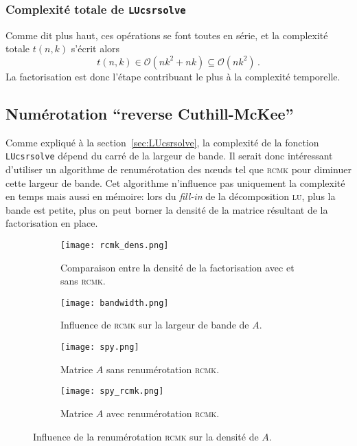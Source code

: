 \documentclass[11pt]{article}
\begin{document}
\subsubsection{Complexité totale de \texttt{LUcsrsolve}}
Comme dit plus haut, ces opérations se font toutes en série, et la complexité totale $t(n, k)$ s'écrit alors
\[
t(n, k) \in \mathcal{O}(nk^2 + nk) \subseteq \mathcal{O}(nk^2)\,.
\]
La factorisation est donc l'étape contribuant le plus à la complexité temporelle.
\subsection{Numérotation \foreignquote{french}{reverse Cuthill-McKee}}
\label{sec:rcmk}
Comme expliqué à la section~\ref{sec:LUcsrsolve}, la complexité de la fonction \lstinline|LUcsrsolve| dépend du carré de la largeur de bande.
Il serait donc intéressant d'utiliser un algorithme de renumérotation des n\oe{}uds tel que \textsc{rcmk} pour diminuer cette largeur de bande. Cet algorithme n'influence pas uniquement la complexité en temps mais aussi en mémoire: lors du \emph{fill-in} de la décomposition \textsc{lu}, plus la bande est petite, plus on peut borner la densité de la matrice résultant de la factorisation en place.
\begin{figure}[H]
	\centering
	\begin{subfigure}[t]{0.27\textwidth}
		\centering
		\texttt{[image: rcmk\_dens.png]}
		\caption{Comparaison entre la densité de la factorisation avec et sans \textsc{rcmk}.}
		\label{fig:rcmk_dens}
	\end{subfigure}\hfill
	\begin{subfigure}[t]{0.27\textwidth}
		\centering
		\texttt{[image: bandwidth.png]}
		\caption{Influence de \textsc{rcmk} sur la largeur de bande de $A$.}
		\label{fig:bandwidth}
	\end{subfigure}\hfill
	\begin{subfigure}[t]{0.2\textwidth}
		\centering
		\texttt{[image: spy.png]}
		\caption{Matrice $A$ sans renumérotation \textsc{rcmk}.}
		\label{fig:spy}
	\end{subfigure}\hfill
	\begin{subfigure}[t]{0.2\textwidth}
		\centering
		\texttt{[image: spy\_rcmk.png]}
		\caption{Matrice $A$ avec renumérotation \textsc{rcmk}.}
		\label{fig:spy_rcmk}
	\end{subfigure}
	\caption{Influence de la renumérotation \textsc{rcmk} sur la densité de $A$.}
	\label{fig:rcmk}
\end{figure}
\end{document}
